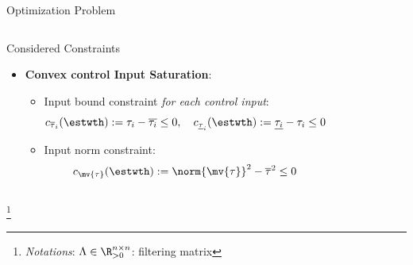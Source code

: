 \documentclass[8pt, aspectratio=169]{beamer}
\begin{document}
\begin{frame}{\insertsubsectionhead}{Optimization Problem}
\begin{columns}
{\begin{block}{Considered Constraints}
\begin{itemize}
        \item \textbf{Convex control Input Saturation}: 
          \begin{itemize}
            \item Input bound constraint \textit{for each control input}:
            \begin{equation}\label{eq:cstr:input_bound}
              c_{\overline{\tau}_i}(\estwth)
              :=
              \tau_i - \overline{\tau_i}
              \le 
              0
              ,
              \quad
              c_{\underline{\tau}_i}(\estwth)
              :=
              \underline{\tau_i} - \tau_i
              \le 
              0
            \end{equation}
            \item Input norm constraint:
            \begin{equation}\label{eq:cstr:input_norm}
              c_{\mv{\tau}}(\estwth)
              :=
              \norm{\mv{\tau}}^2 - \overline{\tau}^2
              \le
              0
            \end{equation}
        \end{itemize}
      \end{itemize}
      
    \end{block}
  }

  \end{columns}

  \let\thefootnote\relax\footnote{
    \textit{Notations}: 
    $\Lambda\in\R_{>0}^{n\times n}$: filtering matrix
  }

\end{frame}
\end{document}
